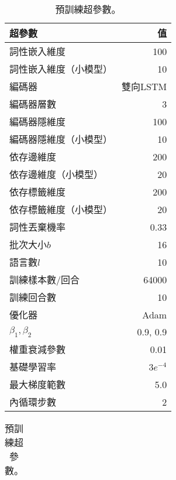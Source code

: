 \begin{table}[htbp]
    \centering
    \begin{subtable}[t]{.4\textwidth}
        \centering
        \begin{tabular}[t]{@{}lr@{}}
        \toprule
        超參數 & 值 \\
        \midrule
            詞性嵌入維度         & 100 \\
            詞性嵌入維度（小模型） & 10 \\
            編碼器              & 雙向LSTM \\
            編碼器層數           & 3 \\
            編碼器隱維度         & 100 \\
            編碼器隱維度（小模型） & 10 \\
            依存邊維度           & 200 \\
            依存邊維度（小模型）   & 20 \\
            依存標籤維度          & 200 \\
            依存標籤維度（小模型） & 20 \\
            詞性丟棄機率            & 0.33 \\
            批次大小$b$         & 16 \\
            語言數$l$           & 10 \\
            訓練樣本數/回合        & 64000 \\
            訓練回合數          & 10 \\
            優化器              & Adam \\
            $\beta_1,\beta_2$  & 0.9, 0.9 \\
            權重衰減參數         & 0.01 \\
            基礎學習率          & $3e^{-4}$ \\
            最大梯度範數        & 5.0 \\
            內循環步數          & 2 \\
        \bottomrule
        \end{tabular}
        \caption{
            預訓練超參數。
        }
        \label{tab:delex_pretrain_hparams}
    \end{subtable}
    \hspace{10pt}
    \begin{subtable}[t]{.4\textwidth}
        \centering
        \begin{tabular}[t]{@{}lr@{}}
        \toprule

\end{tabular}
\end{subtable}
\end{table}
